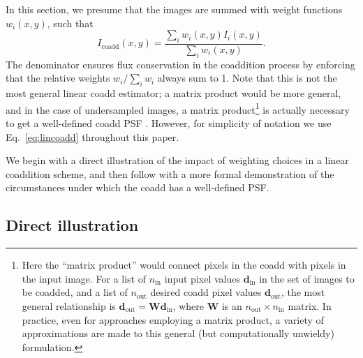 \documentclass{openjournal}
\begin{document}
In this section, we presume that the images are summed with weight functions $w_i(x,y)$, such that
\begin{equation}\label{eq:lincoadd}
    I_\text{coadd}(x,y) = \frac{\sum_i w_i(x,y) I_i(x,y)}{\sum_i w_i(x,y)}.
\end{equation}
The denominator ensures flux conservation in the coaddition process by enforcing that the relative weights $w_i/\sum_i w_i$ always sum to 1. Note that this is not the most general linear coadd estimator; a matrix product would be more general, and in the case of undersampled images, a matrix product\footnote{Here the ``matrix product'' would connect pixels in the coadd with pixels in the input image.  For a list of $n_\text{in}$ input pixel values $\mathbf{d}_\text{in}$ in the set of images to be coadded, and a list of $n_\text{out}$ desired coadd pixel values $\mathbf{d}_\text{out}$, the most general relationship is $\mathbf{d}_\text{out} = \mathbf{W} \mathbf{d}_\text{in}$, where $\mathbf{W}$ is an $n_\text{out}\times n_\text{in}$ matrix.  In practice, even for approaches employing a matrix product, a variety of approximations are made to this general (but computationally unwieldy) formulation.} is actually necessary to get a well-defined coadd PSF \citep{2011ApJ...741...46R}.  However, for simplicity of notation we use Eq.~\eqref{eq:lincoadd} throughout this paper.

We begin with a direct illustration of the impact of weighting choices in a linear coaddition scheme, and then follow with a more formal demonstration of the circumstances under which the coadd has a well-defined PSF.

\subsection{Direct illustration}\label{subsec:direct}
\end{document}
